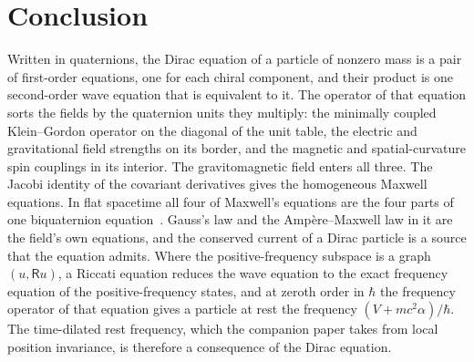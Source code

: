 \documentclass[aps,prd,onecolumn,tightenlines,nofootinbib,notitlepage,11pt,floatfix]{revtex4-2}
\theoremstyle{indentedtheorem}
\begin{document}
\section{Conclusion}
\label{sec:conclusion}

Written in quaternions, the Dirac equation of a particle of nonzero mass is a pair of first-order equations, one for each chiral component, and their product is one second-order wave equation that is equivalent to it. The operator of that equation sorts the fields by the quaternion units they multiply: the minimally coupled Klein--Gordon operator on the diagonal of the unit table, the electric and gravitational field strengths on its border, and the magnetic and spatial-curvature spin couplings in its interior. The gravitomagnetic field enters all three. The Jacobi identity of the covariant derivatives gives the homogeneous Maxwell equations. In flat spacetime all four of Maxwell's equations are the four parts of one biquaternion equation~\citep{Silberstein1912Quaternionic}. Gauss's law and the Amp\`ere--Maxwell law in it are the field's own equations, and the conserved current of a Dirac particle is a source that the equation admits. Where the positive-frequency subspace is a graph $(u,\mathsf{R}u)$, a Riccati equation reduces the wave equation to the exact frequency equation of the positive-frequency states, and at zeroth order in $\hbar$ the frequency operator of that equation gives a particle at rest the frequency $(V+mc^2\alpha)/\hbar$. The time-dilated rest frequency, which the companion paper takes from local position invariance, is therefore a consequence of the Dirac equation.
\end{document}
